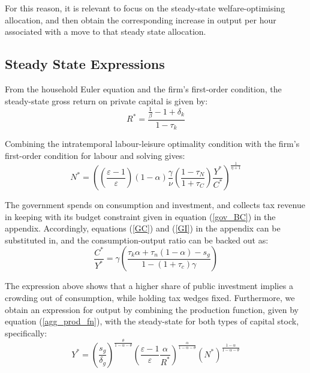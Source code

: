\documentclass[titlepage, 11pt, a4paper]{article}
\renewcommand{\&}{and}
\begin{document}
For this reason, it is relevant to focus on the steady-state welfare-optimising allocation, and then obtain the corresponding increase in output per hour associated with a move to that steady state allocation.

\subsection{Steady State Expressions}

From the household Euler equation and the firm's first-order condition, the steady-state gross return on private capital is given by:
\begin{equation}
R^* = \frac{\frac{1}{\beta}-1+\delta_k}{1-\tau_k}
\label{eq:Rstar}
\end{equation}

Combining the intratemporal labour-leisure optimality condition with the firm's first-order condition for labour and solving gives:
\begin{equation}
N^{*}=\left(\left(\frac{\varepsilon-1}{\varepsilon}\right)\left(1-\alpha\right)\frac{\gamma}{\nu}\left(\frac{1-\tau_{N}}{1+\tau_{C}}\right)\frac{Y^{*}}{C^{*}}\right)^{\frac{1}{\eta+1}}
\label{eq:Nstar}
\end{equation}

The government spends on consumption and investment, and collects tax revenue in keeping with its budget constraint given in equation (\ref{gov_BC}) in the appendix. Accordingly, equations (\ref{GC}) and (\ref{GI}) in the appendix can be substituted in, and the consumption-output ratio can be backed out as:
\begin{equation}
\frac{C^*}{Y^*}
=
\gamma
\left(
\frac{\tau_k \alpha + \tau_n(1-\alpha)-s_g}
{1-(1+\tau_c)\gamma}
\right)
\label{eq:CYratio}
\end{equation}

The expression above shows that a higher share of public investment implies a crowding out of consumption, while holding tax wedges fixed. Furthermore, we obtain an expression for output by combining the production function, given by equation (\ref{agg_prod_fn}), with the steady-state for both types of capital stock, specifically:
\begin{equation}
Y^{*}=\left(\frac{s_{g}}{\delta_{g}}\right)^{\frac{\theta}{1-\alpha-\theta}}
\left(\frac{\varepsilon-1}{\varepsilon}\frac{\alpha}{R^{*}}\right)^{\frac{\alpha}{1-\alpha-\theta}}
\left(N^{*}\right)^{\frac{1-\alpha}{1-\alpha-\theta}}
\label{eq:Ystar}
\end{equation}
\end{document}
